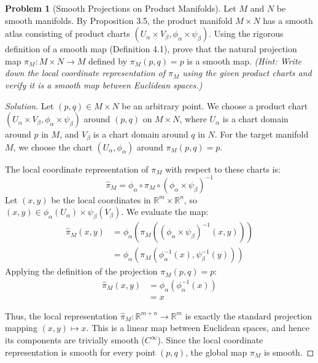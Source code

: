 \documentclass[12pt, a4paper]{article}
\theoremstyle{definition}
\newtheorem{problem}{Problem}
\newenvironment{solution}
  {\renewcommand\qedsymbol{$\blacksquare$}\begin{proof}[Solution]}
  {\end{proof}}
\newcommand{\RR}{\mathbb{R}}
\begin{document}
\begin{problem}[Smooth Projections on Product Manifolds]
Let $M$ and $N$ be smooth manifolds. By Proposition 3.5, the product manifold $M \times N$ has a smooth atlas consisting of product charts $(U_\alpha \times V_\beta, \phi_\alpha \times \psi_\beta)$. 
Using the rigorous definition of a smooth map (Definition 4.1), prove that the natural projection map $\pi_M: M \times N \to M$ defined by $\pi_M(p, q) = p$ is a smooth map. 
\textit{(Hint: Write down the local coordinate representation of $\pi_M$ using the given product charts and verify it is a smooth map between Euclidean spaces.)}
\end{problem}
\begin{solution}
Let $(p,q) \in M \times N$ be an arbitrary point. We choose a product chart $(U_\alpha \times V_\beta, \phi_\alpha \times \psi_\beta)$ around $(p,q)$ on $M \times N$, where $U_\alpha$ is a chart domain around $p$ in $M$, and $V_\beta$ is a chart domain around $q$ in $N$. 
For the target manifold $M$, we choose the chart $(U_\alpha, \phi_\alpha)$ around $\pi_M(p,q) = p$.

The local coordinate representation of $\pi_M$ with respect to these charts is:
\[
\widehat{\pi}_M = \phi_\alpha \circ \pi_M \circ (\phi_\alpha \times \psi_\beta)^{-1}
\]
Let $(x,y)$ be the local coordinates in $\RR^m \times \RR^n$, so $(x,y) \in \phi_\alpha(U_\alpha) \times \psi_\beta(V_\beta)$. We evaluate the map:
\begin{align*}
\widehat{\pi}_M(x,y) &= \phi_\alpha \left( \pi_M \left( (\phi_\alpha \times \psi_\beta)^{-1}(x,y) \right) \right) \\
&= \phi_\alpha \left( \pi_M \left( \phi_\alpha^{-1}(x), \psi_\beta^{-1}(y) \right) \right)
\end{align*}
Applying the definition of the projection $\pi_M(p,q) = p$:
\begin{align*}
\widehat{\pi}_M(x,y) &= \phi_\alpha \left( \phi_\alpha^{-1}(x) \right) \\
&= x
\end{align*}

Thus, the local representation $\widehat{\pi}_M: \RR^{m+n} \to \RR^m$ is exactly the standard projection mapping $(x,y) \mapsto x$. This is a linear map between Euclidean spaces, and hence its components are trivially smooth ($C^\infty$). Since the local coordinate representation is smooth for every point $(p,q)$, the global map $\pi_M$ is smooth.
\end{solution}
\end{document}
